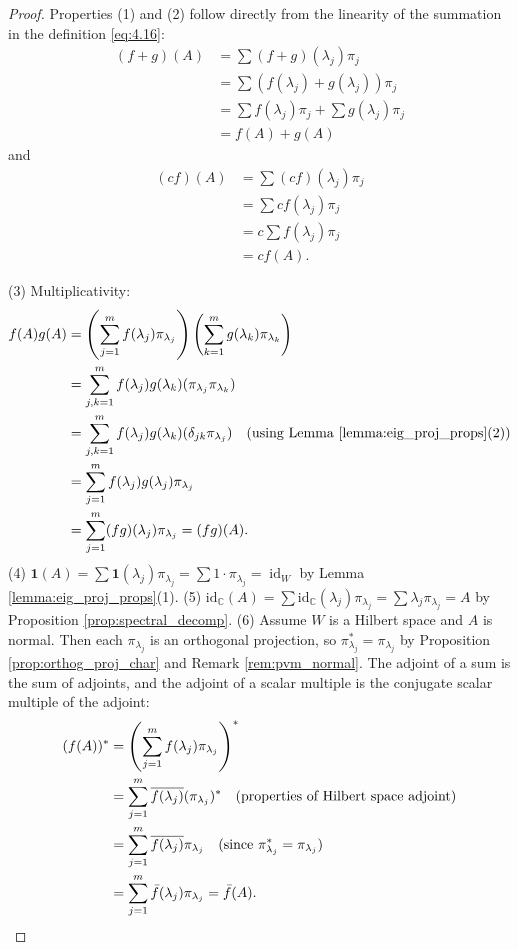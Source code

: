 \begin{proof}
Properties (1) and (2) follow directly from the linearity of the summation in the definition \eqref{eq:4.16}:
\begin{align*}
    (f+g)(A) &= \sum (f+g)(\lambda_j) \pi_j\\ 
    &= \sum (f(\lambda_j)+g(\lambda_j)) \pi_j \\ 
    &= \sum f(\lambda_j)\pi_j + \sum g(\lambda_j)\pi_j \\ 
    &= f(A)+g(A)
\end{align*}
and
\begin{align*}
    (cf)(A) &= \sum (cf)(\lambda_j) \pi_j \\
    &= \sum c f(\lambda_j) \pi_j \\ 
    &= c \sum f(\lambda_j)\pi_j \\
    &= c f(A).
\end{align*}

(3) Multiplicativity:
\begin{align*} f(A) g(A) &= \left( \sum_{j=1}^m f(\lambda_j) \pi_{\lambda_j} \right) \left( \sum_{k=1}^m g(\lambda_k) \pi_{\lambda_k} \right) \\ &= \sum_{j,k=1}^m f(\lambda_j) g(\lambda_k) (\pi_{\lambda_j} \pi_{\lambda_k}) \\ &= \sum_{j,k=1}^m f(\lambda_j) g(\lambda_k) (\delta_{jk} \pi_{\lambda_j}) \quad (\text{using Lemma \ref{lemma:eig_proj_props}(2)}) \\ &= \sum_{j=1}^m f(\lambda_j) g(\lambda_j) \pi_{\lambda_j} \\ &= \sum_{j=1}^m (fg)(\lambda_j) \pi_{\lambda_j} = (fg)(A). \end{align*}
(4) $\mathbf{1}(A) = \sum \mathbf{1}(\lambda_j) \pi_{\lambda_j} = \sum 1 \cdot \pi_{\lambda_j} = \operatorname{id}_W$ by Lemma \ref{lemma:eig_proj_props}(1).
(5) $\mathrm{id}_{\mathbb{C}}(A) = \sum \mathrm{id}_{\mathbb{C}}(\lambda_j) \pi_{\lambda_j} = \sum \lambda_j \pi_{\lambda_j} = A$ by Proposition \ref{prop:spectral_decomp}.
(6) Assume $W$ is a Hilbert space and $A$ is normal. Then each $\pi_{\lambda_j}$ is an orthogonal projection, so $\pi_{\lambda_j}^* = \pi_{\lambda_j}$ by Proposition \ref{prop:orthog_proj_char} and Remark \ref{rem:pvm_normal}. The adjoint of a sum is the sum of adjoints, and the adjoint of a scalar multiple is the conjugate scalar multiple of the adjoint:
\begin{align*} (f(A))^* &= \left( \sum_{j=1}^m f(\lambda_j) \pi_{\lambda_j} \right)^* \\ &= \sum_{j=1}^m \overline{f(\lambda_j)} (\pi_{\lambda_j})^* \quad (\text{properties of Hilbert space adjoint}) \\ &= \sum_{j=1}^m \overline{f(\lambda_j)} \pi_{\lambda_j} \quad (\text{since } \pi_{\lambda_j}^* = \pi_{\lambda_j}) \\ &= \sum_{j=1}^m \bar{f}(\lambda_j) \pi_{\lambda_j} = \bar{f}(A). \qedhere \end{align*}
\end{proof}

